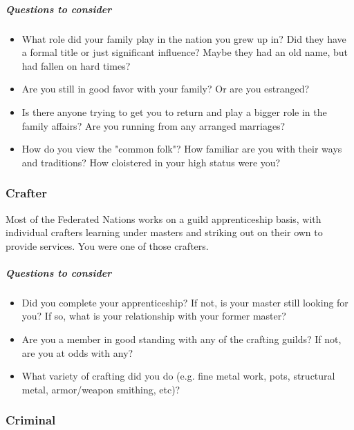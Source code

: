 \subparagraph*{Questions to consider}
\begin{itemize}
	\item What role did your family play in the nation you grew up in? Did they have a formal title or just significant influence? Maybe they had an old name, but had fallen on hard times?
	\item Are you still in good favor with your family? Or are you estranged?
	\item Is there anyone trying to get you to return and play a bigger role in the family affairs? Are you running from any arranged marriages?
	\item How do you view the "common folk"? How familiar are you with their ways and traditions? How cloistered in your high status were you?
\end{itemize}

\subsubsection{Crafter}

Most of the Federated Nations works on a guild apprenticeship basis, with individual crafters learning under masters and striking out on their own to provide services. You were one of those crafters.

\subparagraph*{Questions to consider}
\begin{itemize}
	\item Did you complete your apprenticeship? If not, is your master still looking for you? If so, what is your relationship with your former master?
	\item Are you a member in good standing with any of the crafting guilds? If not, are you at odds with any?
	\item What variety of crafting did you do (e.g. fine metal work, pots, structural metal, armor/weapon smithing, etc)?
\end{itemize}

\subsubsection{Criminal}

